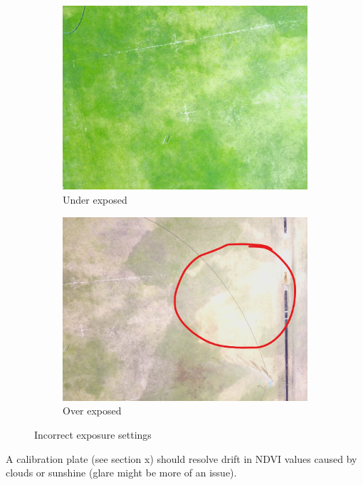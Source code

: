 \begin{figure}[H]
\begin{subfigure}{0.5\textwidth}
\centering
\includegraphics[scale=0.17]{images/under-exposed.jpg}
\caption{Under exposed}
\label{fig:under_exposed}
\end{subfigure}
\begin{subfigure}{0.5\textwidth}
\centering
\includegraphics[scale=0.17]{images/over-exposed.jpg}
\caption{Over exposed}
\label{fig:over_exposed}
\end{subfigure}
\caption{Incorrect exposure settings}
\label{fig:exposure}
\end{figure}

A calibration plate (see section x) should resolve drift in NDVI values caused by clouds or sunshine (glare might be more of an issue).

